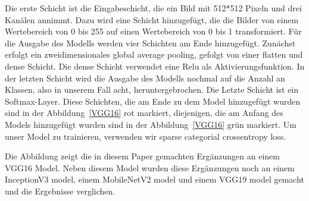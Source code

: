 \documentclass{article}
\begin{document}
Die erste Schicht ist die Eingabeschicht, die ein Bild mit 512*512 Pixeln und drei Kanälen annimmt. 
Dazu wird eine Schicht hinzugefügt, die die Bilder von einem Wertebereich von 0 bis 255 auf einen Wertebereich von 0 bis 1 transformiert.
Für die Ausgabe des Modells werden vier Schichten am Ende hinzugefügt. 
Zunächst erfolgt ein zweidimensionales global average pooling,
gefolgt von einer flatten und dense Schicht. 
Die dense Schicht verwendet eine Relu als Aktivierungsfunktion. 
In der letzten Schicht wird die Ausgabe des Modells nochmal auf die Anzahl an Klassen, 
also in unserem Fall acht, heruntergebrochen. 
Die Letzte Schicht ist ein Softmax-Layer. 
Diese Schichten, die am Ende zu dem Model hinzugefügt wurden sind in der Abbildung~\ref{VGG16} rot markiert,
diejenigen, die am Anfang des Models hinzugefügt wurden sind in der Abbildung~\ref{VGG16} grün markiert.
Um unser Model zu trainieren, verwenden wir sparse categorial crossentropy loss.

Die Abbildung zeigt die in diesem Paper gemachten Ergänzungen an einem VGG16 Model.
Neben diesem Model wurden diese Ergänzungen noch an einem InceptionV3 model,
einem MobileNetV2 model und einem VGG19 model gemacht und die Ergebnisse verglichen.
\end{document}
